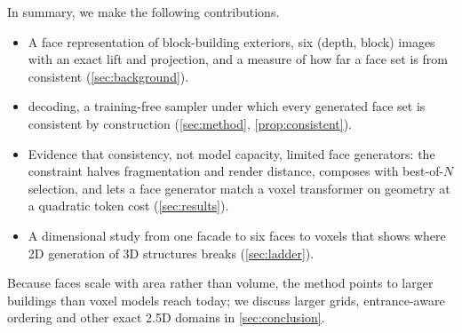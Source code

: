 In summary, we make the following contributions.
\begin{itemize}[leftmargin=*,itemsep=1pt,topsep=2pt]
  \item A face representation of block-building exteriors, six (depth, block) images with an exact
        lift and projection, and a measure of how far a face set is from consistent (\cref{sec:background}).
  \item \cfd{} decoding, a training-free sampler under which every generated face set is consistent
        by construction (\cref{sec:method}, \cref{prop:consistent}).
  \item Evidence that consistency, not model capacity, limited face generators: the constraint
        halves fragmentation and render distance, composes with best-of-$N$ selection, and lets a face
        generator match a voxel transformer on geometry at a quadratic token cost (\cref{sec:results}).
  \item A dimensional study from one facade to six faces to voxels that shows where 2D generation of
        3D structures breaks (\cref{sec:ladder}).
\end{itemize}

Because faces scale with area rather than volume, the method points to larger buildings than voxel
models reach today; we discuss larger grids, entrance-aware ordering and other exact 2.5D domains in
\cref{sec:conclusion}.
